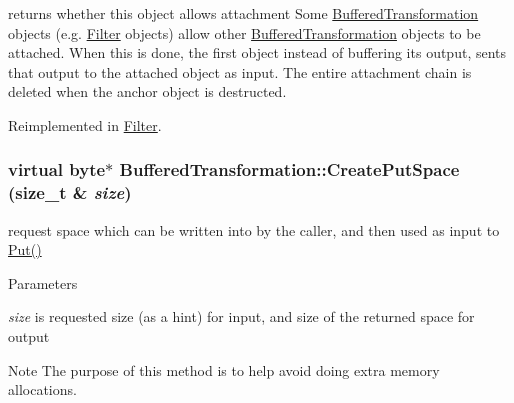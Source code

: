 returns whether this object allows attachment Some \hyperlink{class_buffered_transformation}{BufferedTransformation} objects (e.g. \hyperlink{class_filter}{Filter} objects) allow other \hyperlink{class_buffered_transformation}{BufferedTransformation} objects to be attached. When this is done, the first object instead of buffering its output, sents that output to the attached object as input. The entire attachment chain is deleted when the anchor object is destructed. 

Reimplemented in \hyperlink{class_filter_a6e7251247b5c2cc3b0c15e861cc88e16}{Filter}.\hypertarget{class_buffered_transformation_af390325c959c3d6a2c03a447d6cd469d}{
\subsubsection[{CreatePutSpace}]{\setlength{\rightskip}{0pt plus 5cm}virtual byte$\ast$ BufferedTransformation::CreatePutSpace (size\_\-t \& {\em size})}}
\label{class_buffered_transformation_af390325c959c3d6a2c03a447d6cd469d}


request space which can be written into by the caller, and then used as input to \hyperlink{class_buffered_transformation_ae70658b0d271f8e114ac6c3cc9774ede}{Put()} 
\begin{DoxyParams}{Parameters}
\item[{\em size}]is requested size (as a hint) for input, and size of the returned space for output\end{DoxyParams}
\begin{DoxyNote}{Note}
The purpose of this method is to help avoid doing extra memory allocations. 
\end{DoxyNote}


